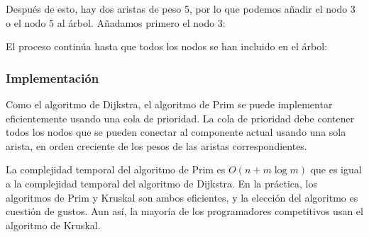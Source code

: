 Después de esto, hay dos aristas de peso 5,
por lo que podemos añadir el nodo 3 o el nodo 5 al árbol.
Añadamos primero el nodo 3:
\begin{center}
\end{center}

\begin{samepage}
El proceso continúa hasta que todos los nodos se han incluido en el árbol:
\begin{center}
\end{center}
\end{samepage}

\subsubsection{Implementación}

Como el algoritmo de Dijkstra, el algoritmo de Prim se puede
implementar eficientemente usando una cola de prioridad.
La cola de prioridad debe contener todos los nodos
que se pueden conectar al componente actual usando
una sola arista, en orden creciente de los pesos
de las aristas correspondientes.

La complejidad temporal del algoritmo de Prim es
$O(n + m \log m)$ que es igual a la complejidad temporal
del algoritmo de Dijkstra.
En la práctica, los algoritmos de Prim y Kruskal
son ambos eficientes, y la elección del algoritmo
es cuestión de gustos.
Aun así, la mayoría de los programadores competitivos usan el algoritmo de Kruskal.

